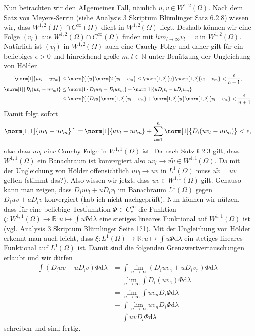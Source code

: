 \begin{solution}
Nun betrachten wir den Allgemeinen Fall, nämlich $u,v\in W^{1,2}(\Omega)$. Nach dem Satz von Meyers-Serrin (siehe Analysis 3 Skriptum Blümlinger Satz 6.2.8) wissen wir, dass $W^{1,2}(\Omega)\cap C^\infty(\Omega)$ dicht in $W^{1,2}(\Omega)$ liegt. Deshalb können wir eine Folge $(v_l)$ aus $W^{1,2}(\Omega)\cap C^\infty(\Omega)$ finden mit $lim_{l\to\infty}v_l=v$ in $W^{1,2}(\Omega)$. Natürlich ist $(v_l)$ in $W^{1,2}(\Omega)$ auch eine Cauchy-Folge und daher gilt für ein beliebiges $\epsilon>0$ und hinreichend große $m,l\in\mathbb{N}$ unter Benützung der Ungleichung von Hölder
\begin{align*}
    \norm[1]{uv_l-uv_m}&\leq\norm[2]{u}\norm[2]{v_l-v_m}\leq\norm[1,2]{u}\norm[1,2]{v_l-v_m}<\frac{\epsilon}{n+1},\\
    \norm[1]{D_i(uv_l-uv_m)}&\leq\norm[1]{D_iuv_l-D_iuv_m}+\norm[1]{uD_iv_l-uD_iv_m}\\
    &\leq\norm[2]{D_iu}\norm[1,2]{v_l-v_m}+\norm[1,2]{u}\norm[1,2]{v_l-v_m}<\frac{\epsilon}{n+1}
\end{align*}
Damit folgt sofort
\begin{align*}
    \norm[1,1]{uv_l-uv_m}^\sim=\norm[1]{uv_l-uv_m}+\sum_{i=1}^n\norm[1]{D_i(uv_l-uv_m)}<\epsilon,
\end{align*}
also dass $uv_l$ eine Cauchy-Folge in $W^{1,1}(\Omega)$ ist. Da nach Satz 6.2.3 gilt, dass $W^{1,1}(\Omega)$ ein Banachraum ist konvergiert also $uv_l\to u\tilde{v}\in W^{1,1}(\Omega)$. Da mit der Ungleichung von Hölder offensichtlich $uv_l\to uv$ in $L^1(\Omega)$ muss $u\tilde{v}=uv$ gelten (stimmt das?). Also wissen wir jetzt, dass $uv\in W^{1,1}(\Omega)$ gilt. Genauso kann man zeigen, dass $D_iuv_l+uD_iv_l$ im Banachraum $L^1(\Omega)$ gegen $D_iuv+uD_iv$ konvergiert (hab ich nicht nachgeprüft). Nun können wir nützen, dass für eine beliebige Testfunktion $\Phi \in C_c^\infty$ die Funktion $\zeta:W^{1,1}(\Omega)\to\mathbb{R}:u\mapsto\int u\Phi\mathrm{d}\lambda$ eine stetiges lineares Funktional auf $W^{1,1}(\Omega)$ ist (vgl. Analysis 3 Skriptum Blümlinger Seite 131). Mit der Ungleichung von Hölder erkennt man auch leicht, dass $\xi:L^1(\Omega)\to\mathbb{R}:u\mapsto\int u\Phi\mathrm{d}\lambda$ ein stetiges lineares Funktional auf $L^1(\Omega)$ ist. Damit sind die folgenden Grenzwertvertauschungen erlaubt und wir dürfen
\begin{align*}
    \int (D_iuv+uD_iv)\Phi\mathrm{d}\lambda&=\int \lim_{n\to\infty}(D_iuv_n+uD_iv_n)\Phi\mathrm{d}\lambda\\
    &=\lim_{n\to\infty}\int D_i(uv_n)\Phi\mathrm{d}\lambda\\
    &=\lim_{n\to\infty}\int uv_nD_i\Phi\mathrm{d}\lambda\\
    &=\int\lim_{n\to\infty}uv_nD_i\Phi\mathrm{d}\lambda\\
    &=\int uvD_i\Phi\mathrm{d}\lambda
\end{align*}
schreiben und sind fertig.
\end{solution}
